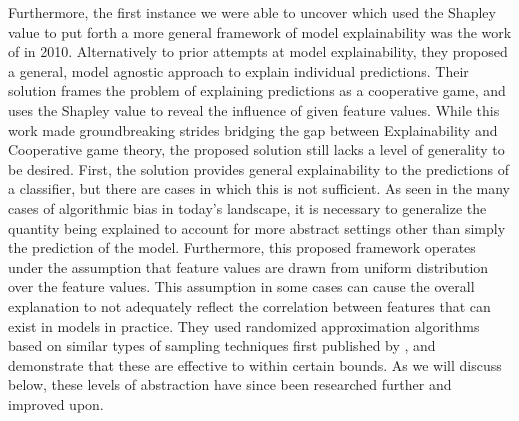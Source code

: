 Furthermore, the first instance we were able to uncover which used the Shapley value to put forth a more general framework of model explainability was the work of \citet{strumbelj_efficient_2010} in 2010. Alternatively to prior attempts at model explainability, they proposed a general, model agnostic approach to explain individual predictions. Their solution frames the problem of explaining predictions as a cooperative game, and uses the Shapley value to reveal the influence of given feature values. While this work made groundbreaking strides bridging the gap between Explainability and Cooperative game theory, the proposed solution still lacks a level of generality to be desired.  First, the solution provides general explainability to the predictions of a classifier, but there are cases in which this is not sufficient. As seen in the many cases of algorithmic bias in today's landscape, it is necessary to generalize the quantity being explained to account for more abstract settings other than simply the prediction of the model.  Furthermore, this proposed framework operates under the assumption that feature values are drawn from uniform distribution over the feature values. This assumption in some cases can cause the overall explanation to not adequately reflect the correlation between features that can exist in models in practice. They used randomized approximation algorithms based on similar types of sampling techniques first published by \citet{regressionInGameTheory_MS4}, and demonstrate that these are effective to within certain bounds. As we will discuss below, these levels of abstraction have since been researched further and improved upon.








